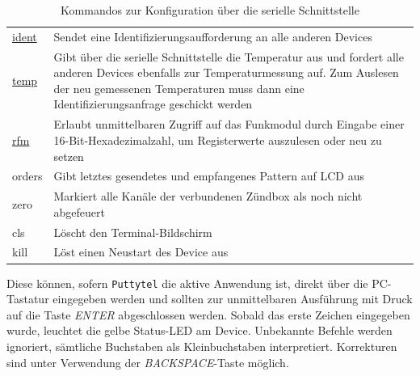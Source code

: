 \documentclass[pdftex, parskip, numbers=noenddot, toc=listof]{scrbook}
\begin{document}
\begin{table}[bt]
\begin{center}
\begin{tabularx}{.9\textwidth}{lX}
				\hyperref[sec:manuellessenden]{ident} & Sendet eine Identifizierungsaufforderung an alle anderen Devices                                                                                                                                                                    \\
				\hyperref[sec:manuellessenden]{temp}  & Gibt über die serielle Schnittstelle die Temperatur aus und fordert alle anderen Devices ebenfalls zur Temperaturmessung auf. Zum Auslesen der neu gemessenen Temperaturen muss dann eine Identifizierungsanfrage geschickt werden \\ \hline
				\hyperref[sec:rfmzugriff]{rfm}        & Erlaubt unmittelbaren Zugriff auf das Funkmodul durch Eingabe einer 16-Bit-Hexadezimalzahl, um Registerwerte auszulesen oder neu zu setzen                                                                                          \\ \hline
				orders                                & Gibt letztes gesendetes und empfangenes Pattern auf LCD aus                                                                                                                                                                         \\
				zero                                  & Markiert alle Kanäle der verbundenen Zündbox als noch nicht abgefeuert                                                                                                                                                            \\ \hline
				cls                                   & Löscht den Terminal-Bildschirm                                                                                                                                                                                                     \\
				kill                                  & Löst einen Neustart des Device aus                                                                                                                                                                                                 \\ \hline
			\end{tabularx}
			\caption{Kommandos zur Konfiguration über die serielle Schnittstelle}
			\label{tab:commands}
		\end{center}
	\end{table}

	Diese können, sofern \texttt{Puttytel} die aktive Anwendung ist, direkt über die PC-Tastatur eingegeben werden und sollten zur unmittelbaren Ausführung mit Druck auf die Taste \emph{ENTER} abgeschlossen werden. Sobald das erste Zeichen eingegeben wurde, leuchtet die gelbe Status-LED am Device. Unbekannte Befehle werden ignoriert, sämtliche Buchstaben als Kleinbuchstaben interpretiert. Korrekturen sind unter Verwendung der \emph{BACKSPACE}-Taste möglich.
\end{document}
